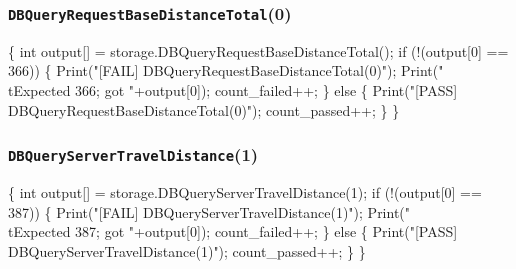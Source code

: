 \documentclass{article}
\def\nwendcode{\endtrivlist \endgroup}
\let\nwdocspar=\par
\theoremstyle{definition}
\begin{document}
\subsubsection{{\tt{}DBQueryRequestBaseDistanceTotal}(0)}
\nwenddocs{}\endmoddef{}
\{
  int output[] = storage.DBQueryRequestBaseDistanceTotal();
  if (!(output[0] == 366)) \{
    Print("[FAIL] DBQueryRequestBaseDistanceTotal(0)");
    Print("\\tExpected 366; got "+output[0]);
    count_failed++;
  \} else \{
    Print("[PASS] DBQueryRequestBaseDistanceTotal(0)");
    count_passed++;
  \}
\}
\nwendcode{}\nwdocspar
\subsubsection{{\tt{}DBQueryServerTravelDistance}(1)}
\nwenddocs{}\endmoddef{}
\{
  int output[] = storage.DBQueryServerTravelDistance(1);
  if (!(output[0] == 387)) \{
    Print("[FAIL] DBQueryServerTravelDistance(1)");
    Print("\\tExpected 387; got "+output[0]);
    count_failed++;
  \} else \{
    Print("[PASS] DBQueryServerTravelDistance(1)");
    count_passed++;
  \}
\}
\nwendcode{}\nwdocspar
\end{document}
